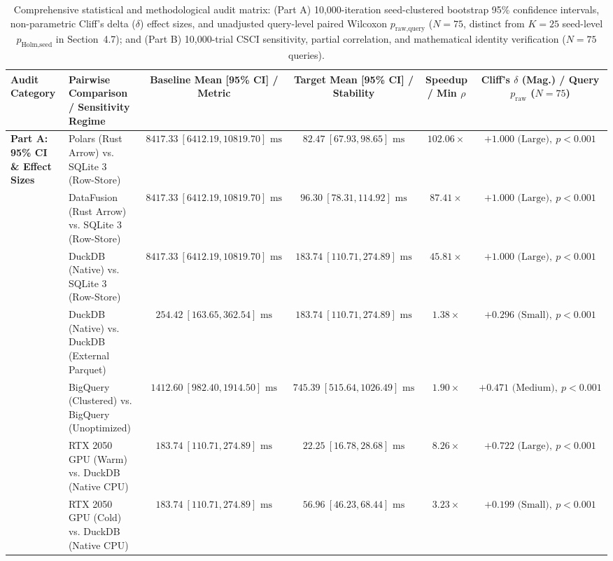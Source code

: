 \documentclass[10pt,a4paper]{article}
\newenvironment{fitasttable}{%
  \begin{lrbox}{\asttblbox}%
}{%
  \end{lrbox}%
  \sbox{\asttblboxB}{%
    \ifdim\wd\asttblbox>0.96\textwidth
      \resizebox{0.96\textwidth}{!}{\usebox{\asttblbox}}%
    \else
      \usebox{\asttblbox}%
    \fi
  }%
  \ifdim\ht\asttblboxB>0.78\textheight
    \resizebox{!}{0.78\textheight}{\usebox{\asttblboxB}}%
  \else
    \usebox{\asttblboxB}%
  \fi
}
\begin{document}
\begin{table}[!htbp]
\centering
\caption{Comprehensive statistical and methodological audit matrix: (Part A) 10,000-iteration seed-clustered bootstrap 95\% confidence intervals, non-parametric Cliff's delta ($\delta$) effect sizes, and unadjusted query-level paired Wilcoxon $p_{\text{raw,query}}$ ($N=75$, distinct from $K=25$ seed-level $p_{\text{Holm,seed}}$ in Section~4.7); and (Part B) 10,000-trial CSCI sensitivity, partial correlation, and mathematical identity verification ($N=75$ queries).}\label{tab:jbd_stat_audit_t10}
\label{tab:reviewer_audit_matrix}
\renewcommand{\arraystretch}{1.18}
\begin{fitasttable}
\begin{tabular}{@{}llcccc@{}}
\toprule
\textbf{Audit Category} & \textbf{Pairwise Comparison / Sensitivity Regime} & \textbf{Baseline Mean [95\% CI] / Metric} & \textbf{Target Mean [95\% CI] / Stability} & \textbf{Speedup / Min $\rho$} & \textbf{Cliff's $\delta$ (Mag.) / Query $p_{\text{raw}}$ ($N=75$)} \\
\midrule
\multirow{10}{*}{\textbf{Part A: 95\% CI \& Effect Sizes}}
 & Polars (Rust Arrow) vs. SQLite 3 (Row-Store) & $8417.33\ [6412.19, 10819.70]\text{ ms}$ & $82.47\ [67.93, 98.65]\text{ ms}$ & $102.06\times$ & $+1.000\text{ (Large)},\ p < 0.001$ \\
 & DataFusion (Rust Arrow) vs. SQLite 3 (Row-Store) & $8417.33\ [6412.19, 10819.70]\text{ ms}$ & $96.30\ [78.31, 114.92]\text{ ms}$ & $87.41\times$ & $+1.000\text{ (Large)},\ p < 0.001$ \\
 & DuckDB (Native) vs. SQLite 3 (Row-Store) & $8417.33\ [6412.19, 10819.70]\text{ ms}$ & $183.74\ [110.71, 274.89]\text{ ms}$ & $45.81\times$ & $+1.000\text{ (Large)},\ p < 0.001$ \\
 & DuckDB (Native) vs. DuckDB (External Parquet) & $254.42\ [163.65, 362.54]\text{ ms}$ & $183.74\ [110.71, 274.89]\text{ ms}$ & $1.38\times$ & $+0.296\text{ (Small)},\ p < 0.001$ \\
 & BigQuery (Clustered) vs. BigQuery (Unoptimized) & $1412.60\ [982.40, 1914.50]\text{ ms}$ & $745.39\ [515.64, 1026.49]\text{ ms}$ & $1.90\times$ & $+0.471\text{ (Medium)},\ p < 0.001$ \\
 & RTX 2050 GPU (Warm) vs. DuckDB (Native CPU) & $183.74\ [110.71, 274.89]\text{ ms}$ & $22.25\ [16.78, 28.68]\text{ ms}$ & $8.26\times$ & $+0.722\text{ (Large)},\ p < 0.001$ \\
 & RTX 2050 GPU (Cold) vs. DuckDB (Native CPU) & $183.74\ [110.71, 274.89]\text{ ms}$ & $56.96\ [46.23, 68.44]\text{ ms}$ & $3.23\times$ & $+0.199\text{ (Small)},\ p < 0.001$ \\

\end{tabular}
\end{fitasttable}
\end{table}
\end{document}
